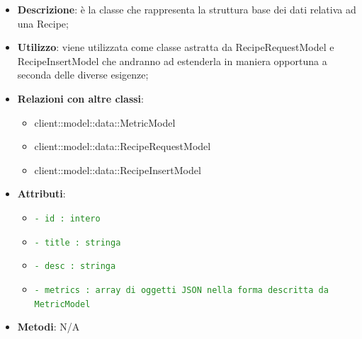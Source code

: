 			\begin{itemize}
				\item \textbf{Descrizione}: è la classe che rappresenta la struttura base dei dati relativa ad una Recipe;
				\item \textbf{Utilizzo}: viene utilizzata come classe astratta da RecipeRequestModel e RecipeInsertModel che andranno ad estenderla in maniera opportuna a seconda delle diverse esigenze;
				\item \textbf{Relazioni con altre classi}:
					\begin{itemize}
						\item client::model::data::MetricModel
						\item client::model::data::RecipeRequestModel
						\item client::model::data::RecipeInsertModel
					\end{itemize}
				\item \textbf{Attributi}:
					\begin{itemize}
						\item \textcolor{forestgreen}{\texttt{- id : intero}}
						\item \textcolor{forestgreen}{\texttt{- title : stringa}}
						\item \textcolor{forestgreen}{\texttt{- desc : stringa}}
						\item \textcolor{forestgreen}{\texttt{- metrics : array di oggetti JSON nella forma descritta da MetricModel}}
					\end{itemize}
				\item \textbf{Metodi}: N/A
			\end{itemize}

